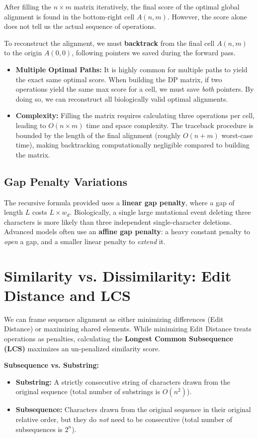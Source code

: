 \documentclass[11pt, a4paper]{article}
\newenvironment{important}
  {\begin{tcolorbox}[colback=blue!5!white, colframe=blue!75!black, arc=1mm, boxrule=1pt]}
  {\end{tcolorbox}}
\begin{document}
After filling the $n \times m$ matrix iteratively, the final score of the optimal global alignment is found in the bottom-right cell $A(n,m)$. However, the score alone does not tell us the actual sequence of operations.

To reconstruct the alignment, we must \textbf{backtrack} from the final cell $A(n,m)$ to the origin $A(0,0)$, following pointers we saved during the forward pass.
\begin{itemize}
    \item \textbf{Multiple Optimal Paths:} It is highly common for multiple paths to yield the exact same optimal score. When building the DP matrix, if two operations yield the same max score for a cell, we must save \textit{both} pointers. By doing so, we can reconstruct all biologically valid optimal alignments.
    \item \textbf{Complexity:} Filling the matrix requires calculating three operations per cell, leading to $O(n \times m)$ time and space complexity. The traceback procedure is bounded by the length of the final alignment (roughly $O(n+m)$ worst-case time), making backtracking computationally negligible compared to building the matrix.
\end{itemize}

\subsection{Gap Penalty Variations}
The recursive formula provided uses a \textbf{linear gap penalty}, where a gap of length $L$ costs $L \times w_d$. Biologically, a single large mutational event deleting three characters is more likely than three independent single-character deletions. Advanced models often use an \textbf{affine gap penalty}: a heavy constant penalty to \textit{open} a gap, and a smaller linear penalty to \textit{extend} it.

\section{Similarity vs. Dissimilarity: Edit Distance and LCS}

We can frame sequence alignment as either minimizing differences (Edit Distance) or maximizing shared elements. While minimizing Edit Distance treats operations as penalties, calculating the \textbf{Longest Common Subsequence (LCS)} maximizes an un-penalized similarity score.

\begin{important}
  \textbf{Subsequence vs. Substring:}
  \begin{itemize}
      \item \textbf{Substring:} A strictly consecutive string of characters drawn from the original sequence (total number of substrings is $O(n^2)$).
      \item \textbf{Subsequence:} Characters drawn from the original sequence in their original relative order, but they do \textit{not} need to be consecutive (total number of subsequences is $2^n$).
  \end{itemize}
\end{important}
\end{document}

